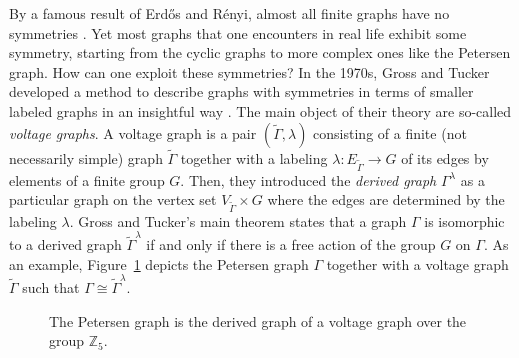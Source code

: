 \documentclass{amsart}
\newcommand{\Z}{\mathbb{Z}}
\theoremstyle{definition}
\theoremstyle{definition}
\begin{document}
By a famous result of Erd\H{o}s and R\'enyi, almost all finite graphs have no symmetries \cite{erdos_asymmetric_1963}. Yet most graphs that one encounters in real life exhibit some symmetry, starting from the cyclic graphs to more complex ones like the Petersen graph. How can one exploit these symmetries? 
In the 1970s, Gross and Tucker developed a method to describe graphs with symmetries in terms of smaller labeled graphs in an insightful way \cite{gross_voltage_1974, gross_topological_1987}. The main object of their theory are so-called \emph{voltage graphs}. A voltage graph is a pair $(\tilde{\Gamma}, \lambda)$ consisting of a finite (not necessarily simple) graph $\tilde{\Gamma}$ together with a labeling $\lambda: E_{\tilde{\Gamma}} \to G$ of its edges by elements of a finite group $G$. Then, they introduced the \emph{derived graph} $\Gamma^\lambda$ as a particular graph on the vertex set $V_{\tilde{\Gamma}} \times G$ where the edges are determined by the labeling $\lambda$. Gross and Tucker's main theorem states that a graph $\Gamma$ is isomorphic to a derived graph $\tilde{\Gamma}^\lambda$ if and only if there is a free action of the group $G$ on $\Gamma$. As an example, Figure~\ref{intro::fig:petersen_graph_as_derived_graph} depicts the Petersen graph $\Gamma$ together with a voltage graph $\tilde{\Gamma}$ such that $\Gamma \cong \tilde{\Gamma}^\lambda$.
%
\begin{figure}
    \centering
    \caption{The Petersen graph is the derived graph of a voltage graph over the group $\Z_5$.}
    \label{intro::fig:petersen_graph_as_derived_graph}
\end{figure}
\end{document}
